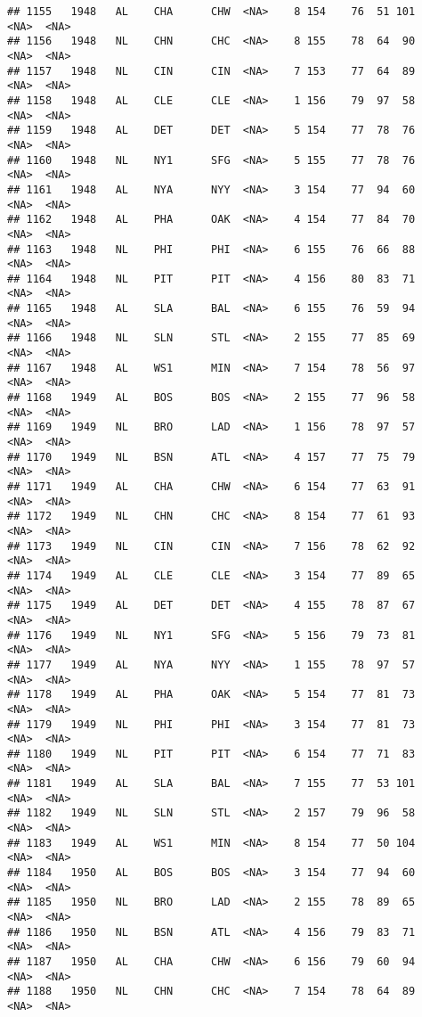 \documentclass[]{article}
\begin{document}
\begin{verbatim}
## 1155   1948   AL    CHA      CHW  <NA>    8 154    76  51 101   <NA>  <NA>
## 1156   1948   NL    CHN      CHC  <NA>    8 155    78  64  90   <NA>  <NA>
## 1157   1948   NL    CIN      CIN  <NA>    7 153    77  64  89   <NA>  <NA>
## 1158   1948   AL    CLE      CLE  <NA>    1 156    79  97  58   <NA>  <NA>
## 1159   1948   AL    DET      DET  <NA>    5 154    77  78  76   <NA>  <NA>
## 1160   1948   NL    NY1      SFG  <NA>    5 155    77  78  76   <NA>  <NA>
## 1161   1948   AL    NYA      NYY  <NA>    3 154    77  94  60   <NA>  <NA>
## 1162   1948   AL    PHA      OAK  <NA>    4 154    77  84  70   <NA>  <NA>
## 1163   1948   NL    PHI      PHI  <NA>    6 155    76  66  88   <NA>  <NA>
## 1164   1948   NL    PIT      PIT  <NA>    4 156    80  83  71   <NA>  <NA>
## 1165   1948   AL    SLA      BAL  <NA>    6 155    76  59  94   <NA>  <NA>
## 1166   1948   NL    SLN      STL  <NA>    2 155    77  85  69   <NA>  <NA>
## 1167   1948   AL    WS1      MIN  <NA>    7 154    78  56  97   <NA>  <NA>
## 1168   1949   AL    BOS      BOS  <NA>    2 155    77  96  58   <NA>  <NA>
## 1169   1949   NL    BRO      LAD  <NA>    1 156    78  97  57   <NA>  <NA>
## 1170   1949   NL    BSN      ATL  <NA>    4 157    77  75  79   <NA>  <NA>
## 1171   1949   AL    CHA      CHW  <NA>    6 154    77  63  91   <NA>  <NA>
## 1172   1949   NL    CHN      CHC  <NA>    8 154    77  61  93   <NA>  <NA>
## 1173   1949   NL    CIN      CIN  <NA>    7 156    78  62  92   <NA>  <NA>
## 1174   1949   AL    CLE      CLE  <NA>    3 154    77  89  65   <NA>  <NA>
## 1175   1949   AL    DET      DET  <NA>    4 155    78  87  67   <NA>  <NA>
## 1176   1949   NL    NY1      SFG  <NA>    5 156    79  73  81   <NA>  <NA>
## 1177   1949   AL    NYA      NYY  <NA>    1 155    78  97  57   <NA>  <NA>
## 1178   1949   AL    PHA      OAK  <NA>    5 154    77  81  73   <NA>  <NA>
## 1179   1949   NL    PHI      PHI  <NA>    3 154    77  81  73   <NA>  <NA>
## 1180   1949   NL    PIT      PIT  <NA>    6 154    77  71  83   <NA>  <NA>
## 1181   1949   AL    SLA      BAL  <NA>    7 155    77  53 101   <NA>  <NA>
## 1182   1949   NL    SLN      STL  <NA>    2 157    79  96  58   <NA>  <NA>
## 1183   1949   AL    WS1      MIN  <NA>    8 154    77  50 104   <NA>  <NA>
## 1184   1950   AL    BOS      BOS  <NA>    3 154    77  94  60   <NA>  <NA>
## 1185   1950   NL    BRO      LAD  <NA>    2 155    78  89  65   <NA>  <NA>
## 1186   1950   NL    BSN      ATL  <NA>    4 156    79  83  71   <NA>  <NA>
## 1187   1950   AL    CHA      CHW  <NA>    6 156    79  60  94   <NA>  <NA>
## 1188   1950   NL    CHN      CHC  <NA>    7 154    78  64  89   <NA>  <NA>

\end{verbatim}
\end{document}
